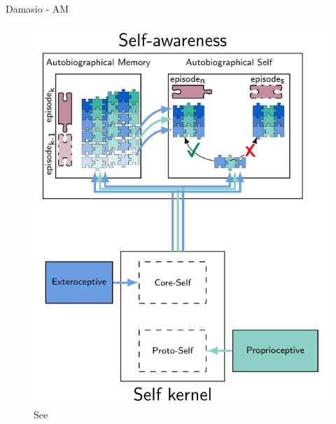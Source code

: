\documentclass[unknownkeysallowed]{beamer}
\begin{document}
\begin{frame}{Damasio - AM}
	\begin{figure}
	\includegraphics[scale=0.3]{regazzoni-2020-multi-sensorial-generative-and-descriptive-self-awareness-models-for-autonomous-systems-fig-4.png}
	\caption{See \cite{regazzoni-2020-multi-sensorial-generative-and-descriptive-self-awareness-models-for-autonomous-systems}}
	\end{figure}
\end{frame}
\end{document}
